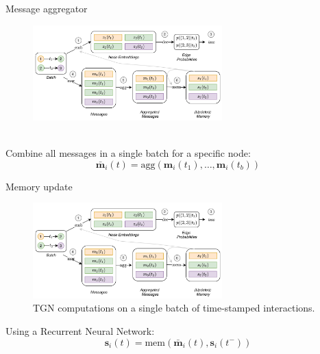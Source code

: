 \documentclass[
  8pt,
  ignorenonframetext,
  aspectratio=43,
]{beamer}
\begin{document}
\begin{frame}{Message aggregator}
\protect\hypertarget{message-aggregator}{}
\begin{figure}
\centering
\includegraphics[width=0.65\textwidth,height=\textheight]{tgn_computations.png}
\caption{~}
\end{figure}

Combine all messages in a single batch for a specific node: \[
\bar{\mathbf{m}}_i(t) = \mathrm{agg}\left(\mathbf{m}_i(t_1), \hdots, \mathbf{m}_i(t_b)\right)
\]
\end{frame}

\begin{frame}{Memory update}
\protect\hypertarget{memory-update}{}
\begin{figure}
\centering
\includegraphics[width=0.65\textwidth,height=\textheight]{tgn_computations.png}
\caption{TGN computations on a single batch of time-stamped
interactions.}
\end{figure}

Using a Recurrent Neural Network: \[
\mathbf{s}_i(t) = \mathrm{mem}\left(\bar{\mathbf{m}}_i(t), \mathbf{s}_i(t^-)\right)
\]
\end{frame}
\end{document}
